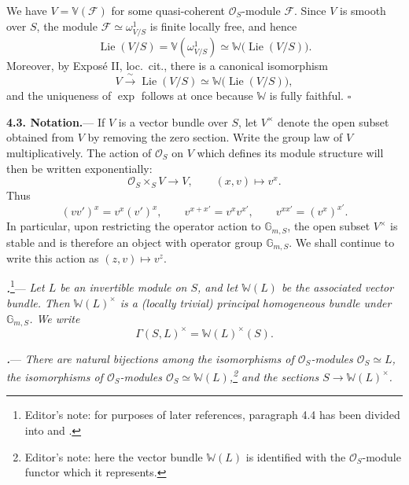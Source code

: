 We have \(V=\mathbb V(\mathscr F)\) for some quasi-coherent
\(\mathcal O_S\)-module \(\mathscr F\).  Since \(V\) is smooth over
\(S\), the module
\(\mathscr F\simeq\omega^1_{V/S}\) is finite locally free, and hence
\[
  \operatorname{Lie}(V/S)
  =
  \mathbb V(\omega^1_{V/S})
  \simeq
  \mathbb W\bigl(\operatorname{Lie}(V/S)\bigr).
\]
Moreover, by Exposé II, loc.\ cit., there is a canonical isomorphism
\[
  V
  \xrightarrow{\ \sim\ }
  \operatorname{Lie}(V/S)
  \simeq
  \mathbb W\bigl(\operatorname{Lie}(V/S)\bigr),
\]
and the uniqueness of \(\exp\) follows at once because
\(\mathbb W\) is fully faithful.
\hfill\(\square\)


\par\medskip\noindent
\textbf{4.3. Notation.}---
If \(V\) is a vector bundle over \(S\), let \(V^\times\) denote the
open subset obtained from \(V\) by removing the zero section.  Write
the group law of \(V\) multiplicatively.  The action of
\(\mathcal O_S\) on \(V\) which defines its module structure will
then be written exponentially:
\[
  \mathcal O_S\times_S V\longrightarrow V,
  \qquad
  (x,v)\longmapsto v^x.
\]
Thus
\[
  (vv')^x=v^x(v')^x,
  \qquad
  v^{x+x'}=v^xv^{x'},
  \qquad
  v^{xx'}=(v^x)^{x'}.
\]
In particular, upon restricting the operator action to
\(\mathbb G_{m,S}\), the open subset \(V^\times\) is stable and is
therefore an object with operator group \(\mathbb G_{m,S}\).  We
shall continue to write this action as
\((z,v)\longmapsto v^z\).

\par\medskip\noindent
{}\textbf{\textit{.}}\footnote{Editor's note: for
purposes of later references, paragraph 4.4 has been divided into
 and .}---
\textit{Let \(L\) be an invertible module on \(S\), and let
\(\mathbb W(L)\) be the associated vector bundle.  Then
\(\mathbb W(L)^\times\) is a \textup{(locally trivial)} principal
homogeneous bundle under \(\mathbb G_{m,S}\).  We write}
\[
  \Gamma(S,L)^\times=\mathbb W(L)^\times(S).
\]

\par\medskip\noindent
{}\textbf{\textit{.}}---
\textit{There are natural bijections among the isomorphisms of
\(\mathcal O_S\)-modules
\(\mathcal O_S\simeq L\), the isomorphisms of
\(\mathcal O_S\)-modules
\(\mathcal O_S\simeq\mathbb W(L)\),\footnote{Editor's note: here the
vector bundle \(\mathbb W(L)\) is identified with the
\(\mathcal O_S\)-module functor which it represents.} and the
sections \(S\to\mathbb W(L)^\times\).}

